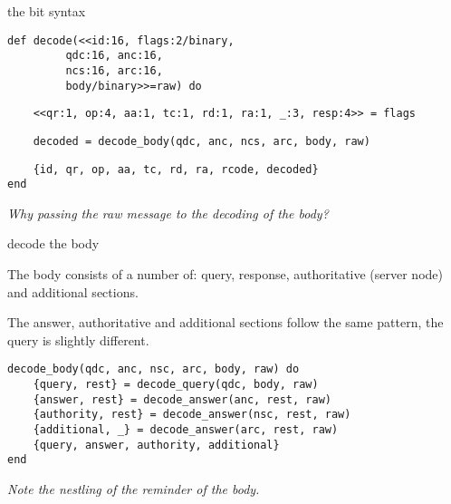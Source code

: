 \begin{frame}[fragile]{the bit syntax}

\begin{verbatim}
def decode(<<id:16, flags:2/binary, 
         qdc:16, anc:16, 
         ncs:16, arc:16, 
         body/binary>>=raw) do
\end{verbatim}

\pause
\begin{verbatim}
    <<qr:1, op:4, aa:1, tc:1, rd:1, ra:1, _:3, resp:4>> = flags
\end{verbatim}
\pause
\begin{verbatim}
    decoded = decode_body(qdc, anc, ncs, arc, body, raw)
\end{verbatim}
\pause
\begin{verbatim}
    {id, qr, op, aa, tc, rd, ra, rcode, decoded}
end
\end{verbatim}


{\em Why passing the raw message to the decoding of the body?}


\end{frame}

\begin{frame}[fragile]{decode the body}

The body consists of a number of: query, response, authoritative (server node) and additional sections.

\vspace{10pt}\pause

The answer, authoritative and additional sections follow the same pattern,
the query is slightly different.

\begin{verbatim}
decode_body(qdc, anc, nsc, arc, body, raw) do
    {query, rest} = decode_query(qdc, body, raw)
    {answer, rest} = decode_answer(anc, rest, raw)
    {authority, rest} = decode_answer(nsc, rest, raw)
    {additional, _} = decode_answer(arc, rest, raw)
    {query, answer, authority, additional}
end
\end{verbatim}

\vspace{10pt}\pause

{\em Note the nestling of the reminder of the body.}

\end{frame}

